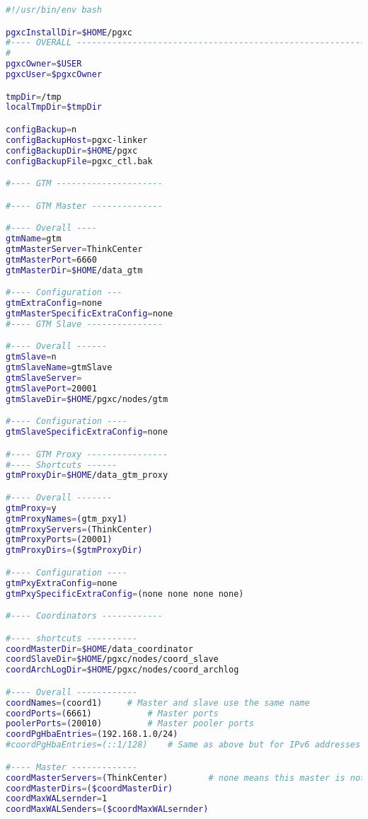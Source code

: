 \label{appendix:pgxcctlconfig} 
\begin{lstlisting}[basicstyle=\tiny,language=bash,caption={Konfigurationsdatei pgxc-ctl}]
#!/usr/bin/env bash

pgxcInstallDir=$HOME/pgxc
#---- OVERALL -----------------------------------------------------------------------------
#
pgxcOwner=$USER	
pgxcUser=$pgxcOwner

tmpDir=/tmp		
localTmpDir=$tmpDir	

configBackup=n					
configBackupHost=pgxc-linker	
configBackupDir=$HOME/pgxc		
configBackupFile=pgxc_ctl.bak	

#---- GTM ---------------------

#---- GTM Master --------------

#---- Overall ----
gtmName=gtm
gtmMasterServer=ThinkCenter
gtmMasterPort=6660
gtmMasterDir=$HOME/data_gtm

#---- Configuration ---
gtmExtraConfig=none		
gtmMasterSpecificExtraConfig=none	
#---- GTM Slave ---------------

#---- Overall ------
gtmSlave=n					
gtmSlaveName=gtmSlave
gtmSlaveServer=		
gtmSlavePort=20001			
gtmSlaveDir=$HOME/pgxc/nodes/gtm	

#---- Configuration ----
gtmSlaveSpecificExtraConfig=none

#---- GTM Proxy ----------------
#---- Shortcuts ------
gtmProxyDir=$HOME/data_gtm_proxy

#---- Overall -------
gtmProxy=y				
gtmProxyNames=(gtm_pxy1)
gtmProxyServers=(ThinkCenter)		
gtmProxyPorts=(20001)				
gtmProxyDirs=($gtmProxyDir)

#---- Configuration ----
gtmPxyExtraConfig=none		
gtmPxySpecificExtraConfig=(none none none none)

#---- Coordinators ------------

#---- shortcuts ----------
coordMasterDir=$HOME/data_coordinator
coordSlaveDir=$HOME/pgxc/nodes/coord_slave
coordArchLogDir=$HOME/pgxc/nodes/coord_archlog

#---- Overall ------------
coordNames=(coord1)		# Master and slave use the same name
coordPorts=(6661)			# Master ports
poolerPorts=(20010)			# Master pooler ports
coordPgHbaEntries=(192.168.1.0/24)				
#coordPgHbaEntries=(::1/128)	# Same as above but for IPv6 addresses

#---- Master -------------
coordMasterServers=(ThinkCenter)		# none means this master is not available
coordMasterDirs=($coordMasterDir)
coordMaxWALsernder=1	
coordMaxWALSenders=($coordMaxWALsernder)


\end{lstlisting}
